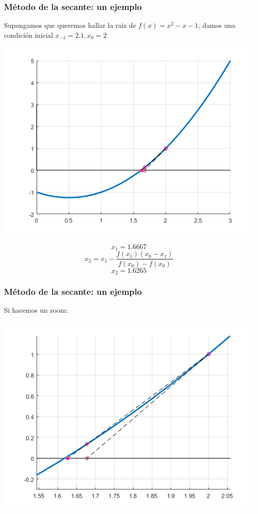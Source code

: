 \documentclass[xcolor=svgnames]{beamer} %
\theoremstyle{plain}
\theoremstyle{definition}
\begin{document}
\begin{frame}
	\frametitle{Método de la secante: un ejemplo}

Supongamos que queremos hallar la raiz de $f(x) = x^2-x-1$,
damos una condición inicial $x_{-1}=2.1,x_0=2$


\begin{minipage}{.7\linewidth}
\includegraphics[width=\linewidth]{sec_example/iter2.png} 

\end{minipage}  \begin{minipage}{.25\linewidth}
$$ x_1 = 1.6667$$
$$ x_2 = x_1 -\frac{f(x_1)(x_0-x_1)}{f(x_0)-f(x_0)}$$
$$ x_2 = 1.6265$$
\end{minipage}

\end{frame}

\begin{frame}
	\frametitle{Método de la secante: un ejemplo}
Si hacemos un zoom:

\begin{minipage}{.8\linewidth}
\includegraphics[width=\linewidth]{sec_example/iter2_zoom.png} 
\end{minipage} 
\end{frame}
\end{document}
